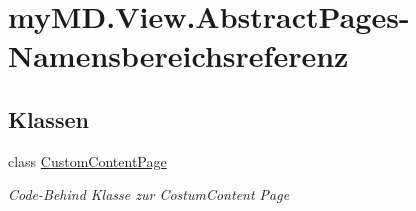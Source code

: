 \hypertarget{namespacemy_m_d_1_1_view_1_1_abstract_pages}{}\section{my\+M\+D.\+View.\+Abstract\+Pages-\/\+Namensbereichsreferenz}
\label{namespacemy_m_d_1_1_view_1_1_abstract_pages}
\subsection*{Klassen}
\begin{DoxyCompactItemize}
\item 
class \mbox{\hyperlink{classmy_m_d_1_1_view_1_1_abstract_pages_1_1_custom_content_page}{Custom\+Content\+Page}}
\begin{DoxyCompactList}\small\item\em Code-\/\+Behind Klasse zur Costum\+Content Page \end{DoxyCompactList}\end{DoxyCompactItemize}
